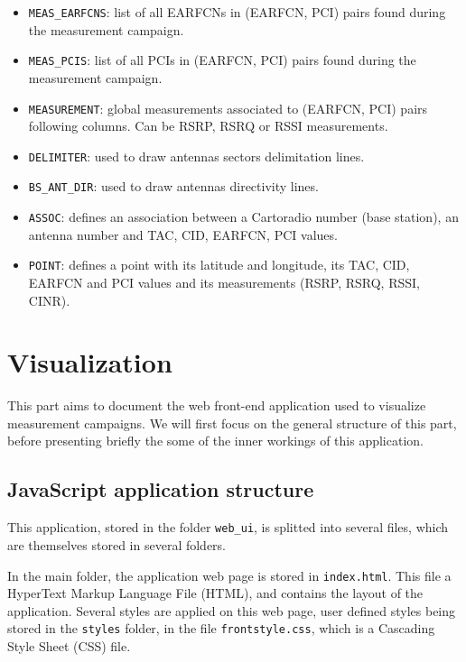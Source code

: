 \documentclass[a4paper, 11pt]{report}
\begin{document}
    \begin{itemize}
        \item \texttt{MEAS\_EARFCNS}: list of all EARFCNs in (EARFCN, PCI) pairs found during the measurement campaign.
        \item \texttt{MEAS\_PCIS}: list of all PCIs in (EARFCN, PCI) pairs found during the measurement campaign.
        \item \texttt{MEASUREMENT}: global measurements associated to (EARFCN, PCI) pairs following columns. Can be RSRP, RSRQ or RSSI measurements.
        \item \texttt{DELIMITER}: used to draw antennas sectors delimitation lines.
        \item \texttt{BS\_ANT\_DIR}: used to draw antennas directivity lines.
        \item \texttt{ASSOC}: defines an association between a Cartoradio number (base station), an antenna number and TAC, CID, EARFCN, PCI values.
        \item \texttt{POINT}: defines a point with its latitude and longitude, its TAC, CID, EARFCN and PCI values and its measurements (RSRP, RSRQ, RSSI, CINR).
    \end{itemize}
    
    \newpage
    
    \section{Visualization}

    This part aims to document the web front-end application used to visualize measurement campaigns.
    We will first focus on the general structure of this part, before presenting briefly the some of the inner
    workings of this application.
    
    \subsection{JavaScript application structure}

    This application, stored in the folder \texttt{web\_ui}, is splitted into several files, which are
    themselves stored in several folders.

    In the main folder, the application web page is stored in \texttt{index.html}. This file a HyperText Markup
    Language File (HTML), and contains the layout of the application. Several styles are applied on this web page, user
    defined styles being stored in the \texttt{styles} folder, in the file \texttt{frontstyle.css}, which is
    a Cascading Style Sheet (CSS) file. \newline
\end{document}
